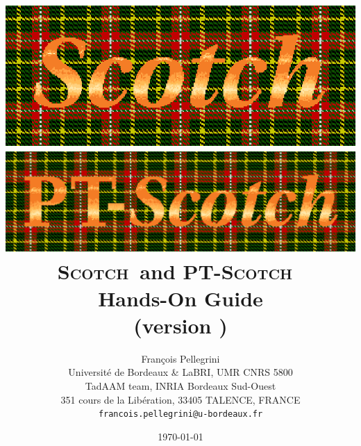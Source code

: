 \documentclass{article}
\newcommand{\scotch}{\textsc{Scotch}\xspace}     %
\newcommand{\ptscotch}{\textsc{PT-Scotch}\xspace} %
\begin{document}
\date{\today}

\title{\includegraphics[scale=0.8]{../misc/scotch_logo_color.ps}\\[0.3em]
       \includegraphics[scale=0.8]{../misc/ptscotch_logo_color.ps}\\[1em]
       {\LARGE\bf \scotch\ and \ptscotch\ \textsc{\scotchver}\\ Hands-On Guide}\\[1em]%
       {\normalsize (version \scotchversub)}\\[1em]}

\author{Fran\c cois Pellegrini\\
Universit\'e de Bordeaux \& LaBRI, UMR CNRS 5800\\
TadAAM team, INRIA Bordeaux Sud-Ouest\\
351 cours de la Lib\'eration, 33405 TALENCE, FRANCE\\
{\tt francois.pellegrini@u-bordeaux.fr}}

\maketitle

\clearpage

\tableofcontents

\end{document}
